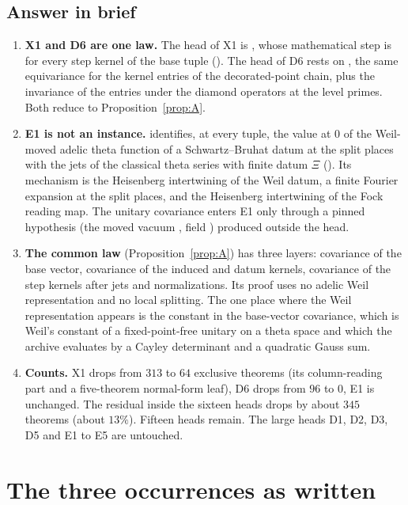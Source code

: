 \documentclass[11pt]{article}
\theoremstyle{definition}
\theoremstyle{remark}
\begin{document}
\subsection{Answer in brief}
\begin{enumerate}[leftmargin=*,itemsep=2pt]
\item \textbf{X1 and D6 are one law.} The head of X1 is , whose mathematical step is  for every step kernel of the base tuple (). The head of D6 rests on , the same equivariance for the kernel entries of the decorated-point chain, plus the invariance of the entries under the diamond operators at the level primes. Both reduce to Proposition~\ref{prop:A}.
\item \textbf{E1 is not an instance.}  identifies, at every tuple, the value at $0$ of the Weil-moved adelic theta function of a Schwartz--Bruhat datum at the split places with the jets of the classical theta series with finite datum $\Xi$ (). Its mechanism is the Heisenberg intertwining of the Weil datum, a finite Fourier expansion at the split places, and the Heisenberg intertwining of the Fock reading map. The unitary covariance enters E1 only through a pinned hypothesis (the moved vacuum , field ) produced outside the head.
\item \textbf{The common law} (Proposition~\ref{prop:A}) has three layers: covariance of the base vector, covariance of the induced and datum kernels, covariance of the step kernels after jets and normalizations. Its proof uses no adelic Weil representation and no local splitting. The one place where the Weil representation appears is the constant in the base-vector covariance, which is Weil's constant of a fixed-point-free unitary on a theta space and which the archive evaluates by a Cayley determinant and a quadratic Gauss sum.
\item \textbf{Counts.} X1 drops from $313$ to $64$ exclusive theorems (its column-reading part and a five-theorem normal-form leaf), D6 drops from $96$ to $0$, E1 is unchanged. The residual inside the sixteen heads drops by about $345$ theorems (about $13\%$). Fifteen heads remain. The large heads D1, D2, D3, D5 and E1 to E5 are untouched.
\end{enumerate}

\section{The three occurrences as written}\label{sec:occ}
\end{document}

